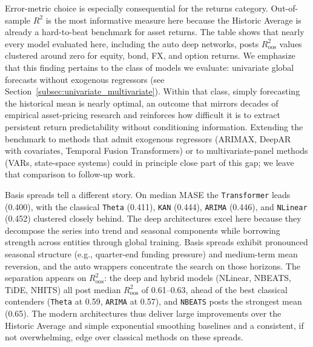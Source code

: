 \documentclass{article}
\newcommand{\floatsource}[1]{\caption*{\footnotesize\emph{#1}}}
\newcommand{\allsources}{Sources: Bloomberg, Board of Governors of the Federal Reserve System, Center for Research in Security Prices, Compustat, Call Reports, FINRA TRACE, OptionMetrics, S\&P Global, Open Source Bond Asset Pricing, He, Kelly, and Manela (2017), Authors' analysis}
\begin{document}
\begin{table}[htbp]
\centering
\caption{Model Performance by Dataset Category}
\label{tab:model_summary_by_category}
\scriptsize

\caption*{\footnotesize \textbf{Note:} Metrics are computed within each dataset category (Basis Spreads, Returns, Other). Lower MASE values indicate better performance; higher $R^2_{\text{oos}}$ values indicate better performance.}
\floatsource{\allsources}
\end{table}

Error-metric choice is especially consequential for the returns category. Out-of-sample $R^2$ is the most informative measure here because the Historic Average is already a hard-to-beat benchmark for asset returns. The table shows that nearly every model evaluated here, including the auto deep networks, posts $R^2_{\text{oos}}$ values clustered around zero for equity, bond, FX, and option returns. We emphasize that this finding pertains to the class of models we evaluate: univariate global forecasts without exogenous regressors (see Section~\ref{subsec:univariate_multivariate}). Within that class, simply forecasting the historical mean is nearly optimal, an outcome that mirrors decades of empirical asset-pricing research and reinforces how difficult it is to extract persistent return predictability without conditioning information. Extending the benchmark to methods that admit exogenous regressors (ARIMAX, DeepAR with covariates, Temporal Fusion Transformers) or to multivariate-panel methods (VARs, state-space systems) could in principle close part of this gap; we leave that comparison to follow-up work.

Basis spreads tell a different story. On median MASE the \texttt{Transformer} leads (0.400), with the classical \texttt{Theta} (0.411), \texttt{KAN} (0.444), \texttt{ARIMA} (0.446), and \texttt{NLinear} (0.452) clustered closely behind. The deep architectures excel here because they decompose the series into trend and seasonal components while borrowing strength across entities through global training. Basis spreads exhibit pronounced seasonal structure (e.g., quarter-end funding pressure) and medium-term mean reversion, and the auto wrappers concentrate the search on those horizons. The separation appears on $R^2_{\text{oos}}$: the deep and hybrid models (NLinear, NBEATS, TiDE, NHITS) all post median $R^2_{\text{oos}}$ of 0.61--0.63, ahead of the best classical contenders (\texttt{Theta} at 0.59, \texttt{ARIMA} at 0.57), and \texttt{NBEATS} posts the strongest mean (0.65). The modern architectures thus deliver large improvements over the Historic Average and simple exponential smoothing baselines and a consistent, if not overwhelming, edge over classical methods on these spreads.
\end{document}
